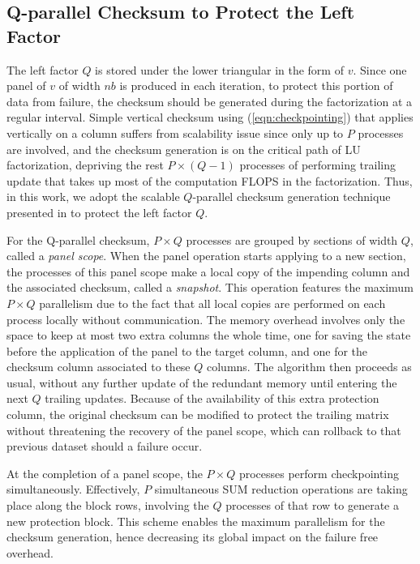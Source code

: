 \subsection{Q-parallel Checksum to Protect the Left Factor}

The left factor $Q$ is stored under the lower triangular in the form
of $v$. Since one panel of $v$ of width $nb$ is produced in each
iteration, to protect this portion of data from failure, the
checksum should be generated during the factorization at a regular
interval.  Simple vertical checksum using (\ref{eqn:checkpointing})
that applies vertically on a column suffers from scalability issue
since only up to $P$ processes are involved, and the checksum generation
is on the critical path of LU factorization, depriving the rest
$P\times (Q-1)$ processes of performing trailing update that takes up
most of the computation FLOPS in the factorization. Thus, in this
work, we adopt the scalable $Q$-parallel checksum generation technique
presented in \cite{lawn253} to protect the left factor $Q$.

For the Q-parallel checksum, $P \times Q$ processes are grouped by
sections of width $Q$, called a \emph{panel scope}. When the panel
operation starts applying to a new section, the processes of this
panel scope make a local copy of the impending column and the
associated checksum, called a \emph{snapshot}. This operation features
the maximum $P \times Q$ parallelism due to the fact that all local
copies are performed on each process locally without
communication. The memory overhead involves only the space to keep at
most two extra columns the whole time, one for saving the state before
the application of the panel to the target column, and one for the
checksum column associated to these $Q$ columns. The algorithm then
proceeds as usual, without any further update of the redundant memory
until entering the next $Q$ trailing updates. Because of the
availability of this extra protection column, the original checksum
can be modified to protect the trailing matrix without threatening the
recovery of the panel scope, which can rollback to that previous
dataset should a failure occur.

At the completion of a panel scope, the $P \times Q$ 
processes perform checkpointing simultaneously. Effectively, $P$
simultaneous SUM reduction operations are taking place along the block
rows, involving the $Q$ processes of that row to generate a new
protection block. This scheme enables the maximum parallelism for the 
checksum generation, hence decreasing its global impact on the failure
free overhead.


